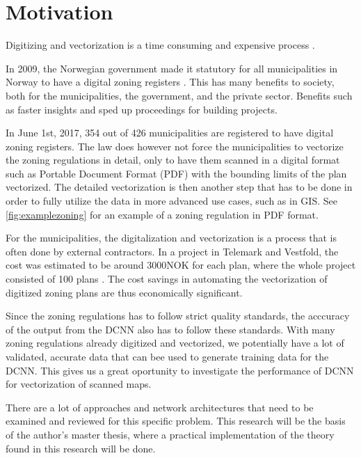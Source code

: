 \chapter{Motivation}\label{chp:motivation}
Digitizing and vectorization is a time consuming and expensive process \cite{Worboys2003}.

In 2009, the Norwegian government made it statutory for all municipalities in Norway to have a digital zoning registers \cite{Kommunaltplanregister2009}. This has many benefits to society, both for the municipalities, the government, and the private sector. Benefits such as faster insights and sped up proceedings for building projects. 

In June 1st, 2017, 354 out of 426 municipalities are registered to have digital zoning registers. The law does however not force the municipalities to vectorize the zoning regulations in detail, only to have them scanned in a digital format such as Portable Document Format (PDF) with the bounding limits of the plan vectorized. The detailed vectorization is then another step that has to be done in order to fully utilize the data in more advanced use cases, such as in GIS. See \autoref{fig:examplezoning} for an example of a zoning regulation in PDF format.

For the municipalities, the digitalization and vectorization is a process that is often done by external contractors. In a project in Telemark and Vestfold, the cost was estimated to be around 3000NOK for each plan, where the whole project consisted of 100 plans \cite{Bo2009}. The cost savings in automating the vectorization of digitized zoning plans are thus economically significant. 

Since the zoning regulations has to follow strict quality standards, the acccuracy of the output from the DCNN also has to follow these standards. With many zoning regulations already digitized and vectorized, we potentially have a lot of validated, accurate data that can bee used to generate training data for the DCNN. This gives us a great oportunity to investigate the performance of DCNN for vectorization of scanned maps. 

There are a lot of approaches and network architectures that need to be examined and reviewed for this specific problem. This research will be the basis of the author's master thesis, where a practical implementation of the theory found in this research will be done. 


